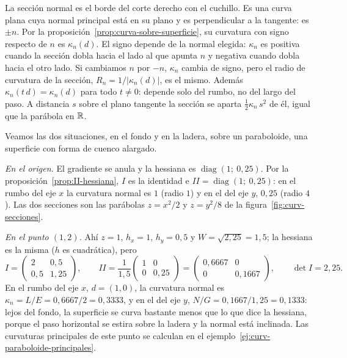La sección normal es el borde del corte derecho con el cuchillo. Es una curva plana cuya normal principal está en su plano y es
perpendicular a la tangente: es \(\pm n\). Por la proposición~\ref{prop:curva-sobre-superficie},
su curvatura con signo respecto de \(n\) es \(\kappa_n(d)\). El signo depende de la normal
elegida: \(\kappa_n\) es positiva cuando la sección dobla hacia el lado al que apunta \(n\) y
negativa cuando dobla hacia el otro lado. Si cambiamos \(n\) por \(-n\), \(\kappa_n\) cambia de
signo, pero el radio de curvatura de la sección, \(R_n=1/\lvert\kappa_n(d)\rvert\), es el mismo. Además
\(\kappa_n(t\,d)=\kappa_n(d)\) para todo \(t\neq0\): depende solo del rumbo, no del largo
del paso. A distancia \(s\) sobre el plano tangente la sección se aparta
\(\tfrac12\kappa_n\,s^2\) de él, igual que la parábola en \(\mathbb{R}\).

Veamos las dos situaciones, en el fondo y en la ladera, sobre un paraboloide, una superficie
con forma de cuenco alargado.

\begin{ejemplo}[Paraboloide \(z=x^2/2+y^2/8\)]\label{ej:curv-paraboloide}
\emph{En el origen.} El gradiente se anula y la hessiana es
\(\operatorname{diag}(1;\ 0{,}25)\). Por la proposición~\ref{prop:II-hessiana}, \(I\) es la
identidad e \(II=\operatorname{diag}(1;\ 0{,}25)\): en el rumbo del eje \(x\) la curvatura
normal es \(1\) (radio \(1\)) y en el del eje \(y\), \(0{,}25\) (radio \(4\)). Las dos secciones
son las parábolas \(z=x^2/2\) y \(z=y^2/8\) de la figura~\ref{fig:curv-secciones}.

\emph{En el punto \((1,2)\).} Ahí \(z=1\), \(h_x=1\), \(h_y=0{,}5\) y \(W=\sqrt{2{,}25}=1{,}5\);
la hessiana es la misma (\(h\) es cuadrática), pero
\[
  I=\begin{pmatrix}2&0{,}5\\0{,}5&1{,}25\end{pmatrix},\qquad
  II=\frac1{1{,}5}\begin{pmatrix}1&0\\0&0{,}25\end{pmatrix}
  =\begin{pmatrix}0{,}6667&0\\0&0{,}1667\end{pmatrix},\qquad \det I=2{,}25 .
\]
En el rumbo del eje \(x\), \(d=(1,0)\), la curvatura normal es
\(\kappa_n=L/E=0{,}6667/2=0{,}3333\), y en el del eje \(y\), \(N/G=0{,}1667/1{,}25=0{,}1333\):
lejos del fondo, la superficie se curva bastante menos que lo que dice la hessiana, porque el
paso horizontal se estira sobre la ladera y la normal está inclinada. Las curvaturas
principales de este punto se calculan en el ejemplo~\ref{ej:curv-paraboloide-principales}.
\end{ejemplo}

